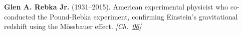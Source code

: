 \textbf{Glen A. Rebka Jr.} (1931–2015). American experimental physicist who co-conducted the Pound-Rebka experiment, confirming Einstein's gravitational redshift using the M\"{o}ssbauer effect. \emph{[Ch.~\hyperref[ch:gravitytimedilation]{06}]}

